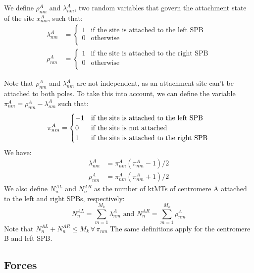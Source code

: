 \documentclass[a4paper,12pt]{article}
\renewcommand{\leq}{\leqslant}
\begin{document}
We define $\rho_{nm}^A$ and $\lambda_{nm}^A$, two random variables that govern
the attachment state of the site $x_{nm}^A$, such that:
\begin{align}
  \label{eq:rholambda}
  \lambda_{nm}^A &=
  \begin{cases}
    1 &\text{if the site is attached to the left SPB}\\
    0 &\text{otherwise}\\
  \end{cases}\\
  \rho_{nm}^A &= 
  \begin{cases}
    1 &\text{if the site is attached to the right SPB}\\
    0 &\text{otherwise}\\
  \end{cases}
\end{align}

Note that $\rho_{nm}^A$ and $\lambda_{nm}^A$ are not independent, as
an attachment site can't be attached to both poles. To take this into
account, we can define the variable $\pi_{nm}^A = \rho_{nm}^A -
\lambda_{nm}^A$ such that:
\begin{equation}
  \label{eq:pnm}
  \pi_{nm}^A = 
  \begin{cases}
    - 1 &\text{if the site is attached to the left SPB}\\
    0 &\text{if the site is not attached}\\
    1 &\text{if the site is attached to the right SPB}\\
  \end{cases}\\
\end{equation}
We have:
\begin{align}
  \lambda_{nm}^A &= \pi_{nm}^A\left(\pi_{nm}^A - 1\right)/2\\
  \rho_{nm}^A &= \pi_{nm}^A\left(\pi_{nm}^A + 1\right)/2
\end{align}
We also define $N_n^{AL}$ and $N_n^{AR}$ as the number of ktMTs of
centromere A attached to the left and right SPBs, respectively:
\begin{equation}
  \label{eq:NAL}
  N_n^{AL} = \sum_{m = 1}^{M_k}\lambda_{nm}^A \mbox{ and }%
  N_n^{AR} = \sum_{m = 1}^{M_k}\rho_{nm}^A 
\end{equation}
Note that $N_n^{AL} + N_n^{AR} \leq M_k\, \forall\, \pi_{nm} $
The same definitions apply for the centromere B and left SPB.

\subsection{Forces}
\end{document}
